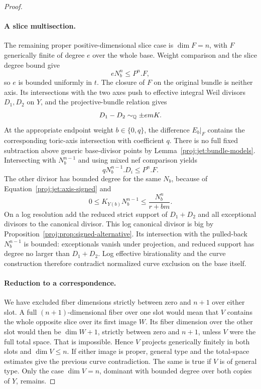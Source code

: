 \begin{proof}
\paragraph{A slice multisection.}
The remaining proper positive-dimensional slice case is
\(\dim F=n\), with \(F\) generically finite of degree \(e\) over
the whole base.  Weight comparison and the slice degree bound give
\[
 eN_b^n\le P^n.F,
\]
so \(e\) is bounded uniformly in \(t\).
The closure of \(F\) on the original bundle is neither axis.
Its intersections with the two axes push to effective integral
Weil divisors \(D_1,D_2\) on \(Y\), and the projective-bundle
relation gives
\begin{equation}\label{proj:jet:axis-signed}
 D_1-D_2\sim_{\mathbb{Q}} \pm emK.
\end{equation}
At the appropriate endpoint weight \(b\in\{0,q\}\), the difference
\(E_b|_F\) contains the corresponding toric-axis intersection with
coefficient \(q\).  There is no full fixed subtraction above
generic base-divisor points by Lemma~\ref{proj:jet:bundle-models}.
Intersecting with \(N_b^{n-1}\) and using mixed nef comparison yields
\[
 qN_b^{n-1}.D_i\le P^n.F.
\]
The other divisor has bounded degree for the same \(N_b\), because
of Equation~\eqref{proj:jet:axis-signed} and
\[
 0\le K_{Y(b)}N_b^{n-1}\le\frac{N_b^n}{r+bm}.
\]
On a log resolution add the reduced strict support of
\(D_1+D_2\) and all exceptional divisors to the canonical divisor.
This log canonical divisor is big by
Proposition~\ref{proj:prop:signed-alternative}.
Its intersection with the pulled-back \(N_b^{n-1}\) is bounded:
exceptionals vanish under projection, and reduced support has
degree no larger than \(D_1+D_2\).
Log effective birationality and the curve construction therefore
contradict normalized curve exclusion on the base itself.

\paragraph{Reduction to a correspondence.}
We have excluded fiber dimensions strictly between zero and
\(n+1\) over either slot.  A full \((n+1)\)-dimensional fiber over
one slot would mean that \(V\) contains the whole opposite slice
over its first image \(W\).  Its fiber dimension over the other
slot would then be \(\dim W+1\), strictly between zero and \(n+1\),
unless \(V\) were the full total space.  That is impossible.
Hence \(V\) projects generically finitely in both slots and
\(\dim V\le n\).  If either image is proper, general type and the
total-space estimates give the previous curve contradiction.
The same is true if \(V\) is of general type.
Only the case \(\dim V=n\), dominant with bounded degree over both
copies of \(Y\), remains.


\end{proof}
